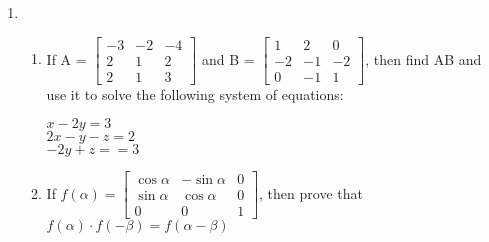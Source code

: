 \begin{enumerate}
    \item \begin{enumerate}
		  \item If A = $\begin{bmatrix}
				  -3& -2& -4 \\ 2& 1& 2\\2& 1& 3
			  \end{bmatrix}$ and B = $\begin{bmatrix} 1& 2& 0\\ -2& -1& -2\\0& -1& 1\end{bmatrix}$, then find AB and use it to solve the following system of equations:\\
				  \begin{center}
					$  x - 2y = 3$\\
					  $2x - y - z = 2 $\\
					  $-2y + z = =3 $\\
				  \end{center}
			  \item If $f(\alpha) = \begin{bmatrix}
			  \cos \alpha& -\sin \alpha& 0\\\sin  \alpha& \cos \alpha& 0\\0& 0& 1  \end{bmatrix}$, then prove that $f(\alpha) \cdot f(-\beta) = f(\alpha - \beta)$
	\end{enumerate}

\end{enumerate}
